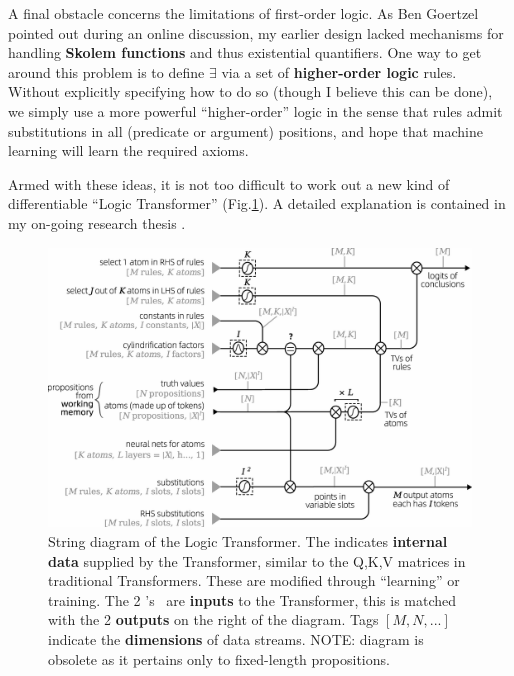 \documentclass[runningheads]{llncs}
\begin{document}
A final obstacle concerns the limitations of first-order logic.  As Ben Goertzel pointed out during an online discussion, my earlier design lacked mechanisms for handling \textbf{Skolem functions} and thus existential quantifiers.  One way to get around this problem is to define $\exists$ via a set of \textbf{higher-order logic} rules.  Without explicitly specifying how to do so (though I believe this can be done), we simply use a more powerful ``higher-order'' logic in the sense that rules admit substitutions in all (predicate or argument) positions, and hope that machine learning will learn the required axioms.

Armed with these ideas, it is not too difficult to work out a new kind of differentiable ``Logic Transformer'' (Fig.\ref{fig:string-diagram}).  A detailed explanation is contained in my on-going research thesis \cite{YKY}.

\begin{figure}
	\hspace{-3cm}
	\includegraphics[scale=.7]{logic-Transformer-string-diagram-3.png}
	\caption{String diagram of the Logic Transformer.  The {\LARGE\color{gray}\RIGHTarrow} indicates \textbf{internal data} supplied by the Transformer, similar to the Q,K,V matrices in traditional Transformers.  These are modified through ``learning'' or training.  The 2 \RIGHTarrow's \ are \textbf{inputs} to the Transformer, this is matched with the 2 \textbf{outputs} on the right of the diagram.  Tags {\color{gray}$[M,N,...]$} indicate the \textbf{dimensions} of data streams.  {\color{red}NOTE:  diagram is obsolete as it pertains only to fixed-length propositions.}}
	\label{fig:string-diagram}
\end{figure}
\end{document}
